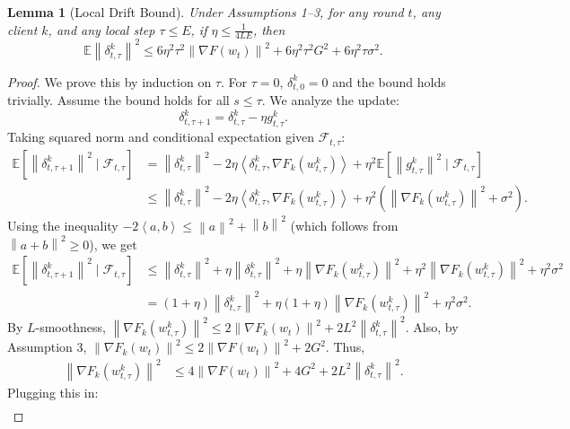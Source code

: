 \documentclass{article}
\newtheorem{lemma}{Lemma}
\newcommand{\norm}[1]{\left\| #1 \right\|}
\newcommand{\inner}[2]{\left\langle #1, #2 \right\rangle}
\begin{document}
\begin{lemma}[Local Drift Bound]
\label{lemma:drift_bound}
Under Assumptions 1--3, for any round $t$, any client $k$, and any local step $\tau \le E$, if $\eta \le \frac{1}{4LE}$, then
\begin{equation}
    \mathbb{E} \norm{\delta_{t,\tau}^k}^2 \le 6\eta^2 \tau^2 \norm{\nabla F(w_t)}^2 + 6\eta^2 \tau^2 G^2 + 6\eta^2 \tau \sigma^2.
\end{equation}
\end{lemma}
\begin{proof}
We prove this by induction on $\tau$. For $\tau=0$, $\delta_{t,0}^k=0$ and the bound holds trivially.
Assume the bound holds for all $s \le \tau$. We analyze the update:
\begin{equation}
    \delta_{t,\tau+1}^k = \delta_{t,\tau}^k - \eta g_{t,\tau}^k.
\end{equation}
Taking squared norm and conditional expectation given $\mathcal{F}_{t,\tau}$:
\begin{align}
\mathbb{E}[\norm{\delta_{t,\tau+1}^k}^2 \mid \mathcal{F}_{t,\tau}]
&= \norm{\delta_{t,\tau}^k}^2 - 2\eta \inner{\delta_{t,\tau}^k}{\nabla F_k(w_{t,\tau}^k)} + \eta^2 \mathbb{E}[\norm{g_{t,\tau}^k}^2 \mid \mathcal{F}_{t,\tau}] \\
&\le \norm{\delta_{t,\tau}^k}^2 - 2\eta \inner{\delta_{t,\tau}^k}{\nabla F_k(w_{t,\tau}^k)} + \eta^2 \left( \norm{\nabla F_k(w_{t,\tau}^k)}^2 + \sigma^2 \right).
\end{align}
Using the inequality $-2\inner{a}{b} \le \norm{a}^2 + \norm{b}^2$ (which follows from $\norm{a+b}^2 \ge 0$), we get
\begin{align}
\mathbb{E}[\norm{\delta_{t,\tau+1}^k}^2 \mid \mathcal{F}_{t,\tau}]
&\le \norm{\delta_{t,\tau}^k}^2 + \eta \norm{\delta_{t,\tau}^k}^2 + \eta \norm{\nabla F_k(w_{t,\tau}^k)}^2 + \eta^2 \norm{\nabla F_k(w_{t,\tau}^k)}^2 + \eta^2 \sigma^2 \\
&= (1+\eta) \norm{\delta_{t,\tau}^k}^2 + \eta(1+\eta) \norm{\nabla F_k(w_{t,\tau}^k)}^2 + \eta^2 \sigma^2.
\end{align}
By $L$-smoothness, $\norm{\nabla F_k(w_{t,\tau}^k)}^2 \le 2\norm{\nabla F_k(w_t)}^2 + 2L^2 \norm{\delta_{t,\tau}^k}^2$. Also, by Assumption 3, $\norm{\nabla F_k(w_t)}^2 \le 2\norm{\nabla F(w_t)}^2 + 2G^2$. Thus,
\begin{align}
\norm{\nabla F_k(w_{t,\tau}^k)}^2 &\le 4\norm{\nabla F(w_t)}^2 + 4G^2 + 2L^2 \norm{\delta_{t,\tau}^k}^2.
\end{align}
Plugging this in:
\begin{align}

\end{align}
\end{proof}
\end{document}
